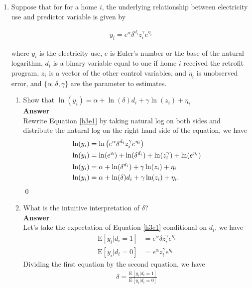\documentclass{article}
\newcommand{\E}{\text{E}}
\begin{document}
\begin{enumerate}
\item Suppose that for for a home $i$, the underlying relationship between electricity use and predictor variable is given by 

\begin{align}
    y_i=e^\alpha\delta^{d_i}z_i^{\gamma}e^{\eta_i} \label{h3e1}
\end{align}

where $y_i$ is the electricity use, $e$ is Euler's number or the base of the natural logarithm, $d_i$ is a binary variable equal to one if home $i$ received the retrofit program, $z_i$ is a vector of the other control variables, and $\eta_i$ is unobserved error, and $\{\alpha,\delta,\gamma\}$ are the parameter to estimates.

\begin{enumerate}
    \item Show that $\ln(y_i)=\alpha+\ln(\delta)d_i+\gamma\ln(z_i)+\eta_i$
    \\\textbf{Answer}\\
    Rewrite Equation \eqref{h3e1} by taking natural log on both sides and distribute the natural log on the right hand side of the equation, we have
    \begin{align}
         \ln(y_i)&=\ln\left(e^\alpha\delta^{d_i}z_i^{\gamma}e^{\eta_i}\right) \notag\\
        \ln(y_i)&=\ln(e^\alpha)+\ln(\delta^{d_i})+\ln(z_i^{\gamma})+\ln(e^{\eta_i}) \notag\\
        \ln(y_i)&=\alpha+\ln(\delta^{d_i})+\gamma\ln(z_i)+\eta_i \notag\\
        \ln(y_i)&=\alpha+\ln(\delta)d_i+\gamma\ln(z_i)+\eta_i\notag.
    \end{align}\qed
    \item What is the intuitive interpretation of $\delta$?
    \\\textbf{Answer}\\
    Let's take the expectation of Equation \eqref{h3e1} conditional on $d_i$, we have
    \begin{align}
        \E[y_i|d_i=1]&=e^\alpha\delta z_i^{\gamma}e^{\eta_i}\\
        \E[y_i|d_i=0]&=e^\alpha z_i^{\gamma}e^{\eta_i}
    \end{align}
    Dividing the first equation by the second equation, we have
    \begin{align}
        \delta=\frac{\E[y_i|d_i=1]}{\E[y_i|d_i=0]}  
    \end{align}

\end{enumerate}
\end{enumerate}
\end{document}
